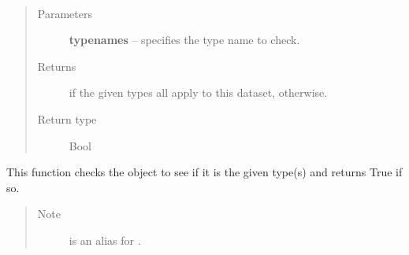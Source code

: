 \documentclass[letterpaper,10pt,english]{sphinxmanual}
\begin{document}
\begin{fulllineitems}
\label{chapter_AstroDataClass:astrodata.data.AstroData.is_type}~\begin{quote}\begin{description}
\item[{Parameters}] \leavevmode
\textbf{typenames} -- specifies the type name to check.

\item[{Returns}] \leavevmode
{} if the given types all apply to this dataset,
 otherwise.

\item[{Return type}] \leavevmode
Bool

\end{description}\end{quote}

This function checks the  object to see if it is the
given type(s) and returns True if so.
\begin{quote}\begin{description}
\item[{Note }] \leavevmode
{} is an alias for 
.

\end{description}\end{quote}

\end{fulllineitems}


\end{document}
